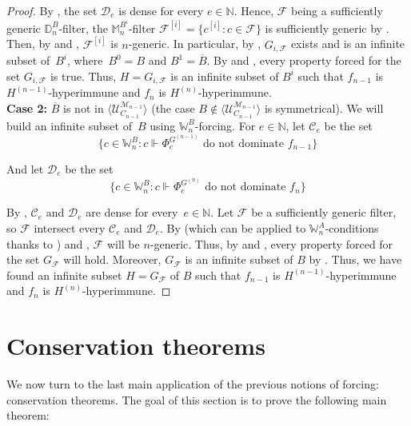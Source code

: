 \documentclass{article}
\def\NN{\mathbb{N}}
\def\DD{\mathbb{D}}
\def\WW{\mathbb{W}}
\def\MM{\mathbb{M}}
\def\F{\mathcal{F}}
\def\U{\mathcal{U}}
\def\C{\mathcal{C}}
\def\D{\mathcal{D}}
\def\M{\mathcal{M}}
\numberwithin{theorem}{section}
\theoremstyle{definition}
\begin{document}
\begin{proof}
By , the set $\D_e$ is dense for every $e \in \NN$. Hence, $\F$ being a sufficiently generic $\DD^B_n$-filter, the $\MM_n^{B^i}$-filter $\F^{[i]} = \{c^{[i]} : c \in \F\}$ is sufficiently generic by . Then, by  and , $\F^{[i]}$ is $n$-generic. In particular, by , $G_{i,\F}$ exists and is an infinite subset of~$B^i$, where~$B^0 = B$ and $B^1 = \overline{B}$. By  and , every property forced for the set $G_{i,\F}$ is true. Thus, $H = G_{i,\F}$ is an infinite subset of $B^i$ such that $f_{n-1}$ is $H^{(n-1)}$-hyperimmune and $f_n$ is $H^{(n)}$-hyperimmune.\\  


\textbf{Case 2:} $\overline{B}$ is not in $\langle \U_{C_{n-1}}^{\M_{n-1}} \rangle$ (the case $B \notin \langle \U_{C_{n-1}}^{\M_{n-1}} \rangle$ is symmetrical). We will build an infinite subset of~$B$ using $\WW^B_n$-forcing. For $e \in \NN$, let $\C_e$ be the set
$$\{c \in \WW^B_n : c \Vdash \Phi_{e}^{G^{(n-1)}} \mbox{ do not dominate } f_{n-1} \}$$

And let $\D_e$ be the set
$$\{c \in \WW^B_n : c \Vdash \Phi_{e}^{G^{(n)}} \mbox{ do not dominate } f_{n} \}$$

By , $\C_e$ and $\D_e$ are dense for every~$e \in \NN$.
Let $\F$ be a sufficiently generic filter, so $\F$ intersect every $\C_e$ and $\D_e$. By  (which can be applied to $\WW_n^A$-conditions thanks to )  and , $\F$ will be $n$-generic. Thus, by  and , every property forced for the set $G_{\F}$ will hold. Moreover, $G_\F$ is an infinite subset of $B$ by . Thus, we have found an infinite subset $H = G_{\F}$ of $B$ such that $f_{n-1}$ is $H^{(n-1)}$-hyperimmune and $f_n$ is $H^{(n)}$-hyperimmune.

\end{proof}


\section{Conservation theorems}\label{sect:conservation}

We now turn to the last main application of the previous notions of forcing: conservation theorems.
The goal of this section is to prove the following main theorem:
\end{document}
